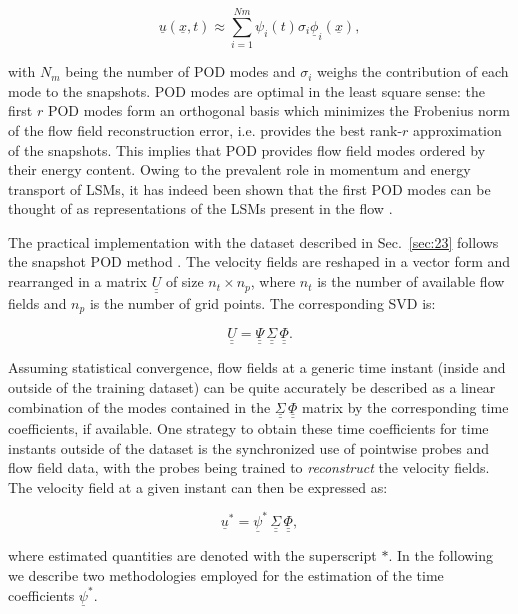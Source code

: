 \begin{equation}
   \underline{u}(\underline{x},t) \approx \sum_{i=1}^{Nm}\psi_i(t)\sigma_i\underline{\phi}_i(\underline{x}),
\end{equation}{}

\noindent with $N_m$ being the number of POD modes and $\sigma_i$ weighs the contribution of each mode to the snapshots.
POD modes are optimal in the least square sense: the first $r$ POD modes form an orthogonal basis which minimizes the Frobenius norm of the flow field reconstruction error, i.e. provides the best rank-$r$ approximation of the snapshots.
This implies that POD provides flow field modes ordered by their energy content.
Owing to the prevalent role in momentum and energy transport of LSMs, it has indeed been shown that the first POD modes can be thought of as representations of the LSMs present in the flow \citep{wu2014study}.

The practical implementation with the dataset described in Sec.~\ref{sec:23} follows the snapshot POD method \citep{sirovich1987turbulence}.
The velocity fields are reshaped in a vector form and rearranged in a matrix  $\underline{\underline{U}}$ of size $n_t \times n_p$, where $n_t$ is the number of available flow fields and $n_p$ is the number of grid points.
The corresponding SVD is:

\begin{equation}
   \underline{\underline{U}} = \underline{\underline{\Psi}}\,\underline{\underline{\Sigma}}\,\underline{\underline{\Phi}}.
\end{equation}

Assuming statistical convergence, flow fields at a generic time instant (inside and outside of the training dataset) can be quite accurately be described as a linear combination of the modes contained in the $\underline{\underline{\Sigma}}\,\underline{\underline{\Phi}}$ matrix by the corresponding time coefficients, if available.
One strategy to obtain these time coefficients for time instants outside of the dataset is the synchronized use of pointwise probes and flow field data, with the probes being trained to \textit{reconstruct} the velocity fields.
The velocity field at a given instant can then be expressed as:

\begin{equation}
   \underline{u}^* = \underline{\psi}^*\,\underline{\underline{\Sigma}}\,\underline{\underline{\Phi}},
\end{equation}

\noindent where estimated quantities are denoted with the superscript $*$.
In the following we describe two methodologies employed for the estimation of the time coefficients $\underline{\psi}^*$.

